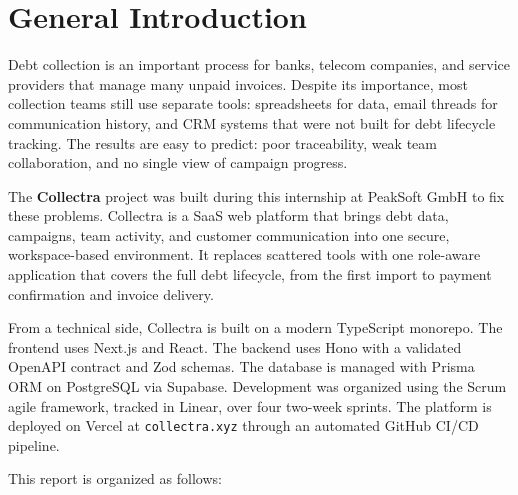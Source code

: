 \documentclass[12pt,a4paper]{report}
\begin{document}
\clearpage
\hypersetup{linkcolor=blue, urlcolor=blue, citecolor=blue}

\chapter*{General Introduction}
{}

Debt collection is an important process for banks, telecom companies, and service
providers that manage many unpaid invoices.
Despite its importance, most collection teams still use separate tools: spreadsheets
for data, email threads for communication history, and CRM systems that were not
built for debt lifecycle tracking.
The results are easy to predict: poor traceability, weak team collaboration, and no
single view of campaign progress.

The \textbf{Collectra} project was built during this internship at PeakSoft GmbH
to fix these problems.
Collectra is a SaaS web platform that brings debt data, campaigns, team activity,
and customer communication into one secure, workspace-based environment.
It replaces scattered tools with one role-aware application that covers the full
debt lifecycle, from the first import to payment confirmation and invoice delivery.

From a technical side, Collectra is built on a modern TypeScript monorepo.
The frontend uses Next.js and React.
The backend uses Hono with a validated OpenAPI contract and Zod schemas.
The database is managed with Prisma ORM on PostgreSQL via Supabase.
Development was organized using the Scrum agile framework, tracked in Linear, over
four two-week sprints.
The platform is deployed on Vercel at \texttt{collectra.xyz} through an automated
GitHub CI/CD pipeline.

This report is organized as follows:
\end{document}

